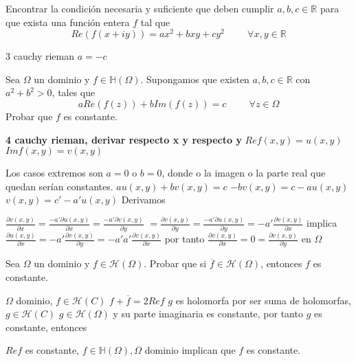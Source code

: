 \begin{ejer}
	Encontrar la condición necesaria y suficiente que deben cumplir $a,b,c\in\mathbb{R}$ para que exista una función entera $f$ tal que
	$$ Re(f(x+iy)) = ax^2+bxy+cy^2\hspace{1cm}\forall x,y\in\mathbb{R} $$
\end{ejer}
3 cauchy rieman
$a=-c$


\begin{ejer}
	Sea $\Omega$ un dominio y $f\in\mathbb{H}(\Omega)$. Supongamos que existen $a,b,c\in\mathbb{R}$ con $a^2+b^2>0$, tales que
	$$ aRe(f(z)) + bIm(f(z)) = c\hspace{1cm} \forall z\in\Omega $$
	Probar que $f$ es constante.
\end{ejer}

\begin{sol}


\textbf{4 cauchy rieman, derivar respecto x y respecto y}
$Ref (x,y) = u(x,y)$ $Imf(x,y) = v(x,y)$

Los casos extremos son $a=0$ o $b=0$, donde o la imagen o la parte real que quedan serían constantes.
$au(x,y)+bv(x,y)=c$
$-bv(x,y) = c-au(x,y)$
$v(x,y)= c'-a'u(x,y)$
Derivamos

$\frac{\partial v(x,y)}{\partial x} = \frac{-a' \partial u(x,y)}{\partial x} = \frac{-a' \partial v(x,y)}{\partial y}$
$= \frac{\partial v(x,y)}{\partial y} = \frac{-a' \partial u(x,y)}{\partial y} = -a' \frac{\partial v(x,y)}{\partial x}$
implica
$\frac{\partial u (x,y)}{\partial x} = -a'\frac{\partial v(x,y)}{\partial y} = -a'a'\frac{\partial v(x,y)}{\partial x}$
por tanto
$\frac{\partial v(x,y)}{\partial x} = 0 = \frac{\partial v(x,y)}{\partial y}$ en $\Omega$
\end{sol}



\begin{ejer}
	Sea $\Omega$ un dominio y $f\in\mathcal{H}(\Omega)$. Probar que si $\overline{f}\in\mathcal{H}(\Omega)$, entonces $f$ es constante.
\end{ejer}


\begin{sol}
$\Omega$ dominio, $f\in\mathcal{H}(C)$
$f+\overline{f} = 2Re f$
$g$ es holomorfa por ser suma de holomorfas, $g\in\mathcal{H}(C)$
$g\in\mathcal{H}(\Omega)$ y su parte imaginaria es constante, por tanto $g$ es constante, entonces

$Re f$ es constante, $f\in\mathbb{H}(\Omega), \Omega$ dominio implican que $f$ es constante.
\end{sol}





